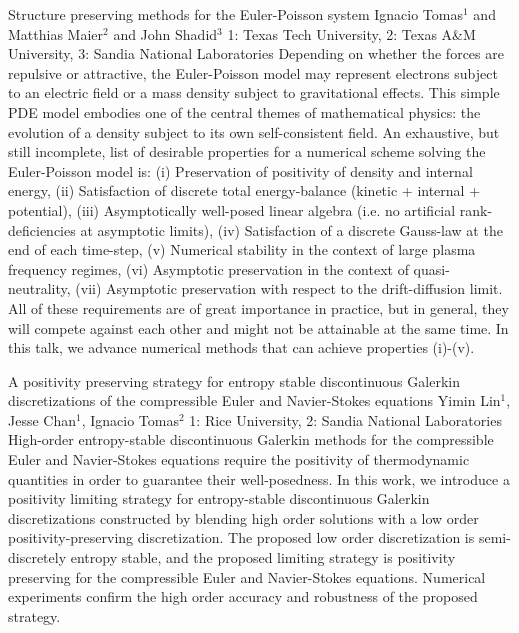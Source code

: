 \vspace{1.5ex}
\abs
{Structure preserving methods for the Euler-Poisson system}
{Ignacio Tomas$^{1}$ and Matthias Maier$^{2}$ and John Shadid$^{3}$}
{1: Texas Tech University, 2: Texas A\&M University, 3: Sandia National Laboratories}
{Depending on whether the forces are repulsive or attractive, the Euler-Poisson model may represent electrons subject to an electric field or a mass density subject to gravitational effects. This simple PDE model embodies one of the central themes of mathematical physics: the evolution of a density subject to its own self-consistent field. An exhaustive, but still incomplete, list of desirable properties for a numerical scheme solving the Euler-Poisson model is: (i) Preservation of positivity of density and internal energy, (ii) Satisfaction of discrete total energy-balance (kinetic + internal + potential), (iii) Asymptotically well-posed linear algebra (i.e. no artificial rank-deficiencies at asymptotic limits), (iv) Satisfaction of a discrete Gauss-law at the end of each time-step, (v) Numerical stability in the context of large plasma frequency regimes, (vi) Asymptotic preservation in the context of quasi-neutrality, (vii) Asymptotic preservation with respect to the drift-diffusion limit. All of these requirements are of great importance in practice, but in general, they will compete against each other and might not be attainable at the same time. In this talk, we advance numerical methods that can achieve properties (i)-(v).}


\vspace{1.5ex}
\abs
{A positivity preserving strategy for entropy stable discontinuous Galerkin discretizations of the compressible Euler and Navier-Stokes equations}
{Yimin Lin$^{1}$, Jesse Chan$^{1}$, Ignacio Tomas$^{2}$}
{1: Rice University, 2: Sandia National Laboratories}
{High-order entropy-stable discontinuous Galerkin methods for the compressible Euler and Navier-Stokes equations require the positivity of thermodynamic quantities in order to guarantee their well-posedness. In this work, we introduce a positivity limiting strategy for entropy-stable discontinuous Galerkin discretizations constructed by blending high order solutions with a low order positivity-preserving discretization. The proposed low order discretization is semi-discretely entropy stable, and the proposed limiting strategy is positivity preserving for the compressible Euler and Navier-Stokes equations. Numerical experiments confirm the high order accuracy and robustness of the proposed strategy.}



